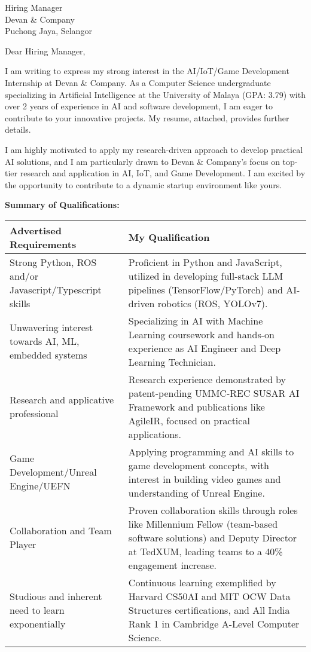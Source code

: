 \documentclass[10.5pt]{letter}
\date{\today}
\begin{document}
\begin{letter}{Hiring Manager\\Devan \& Company\\Puchong Jaya, Selangor}

\opening{Dear Hiring Manager,}

I am writing to express my strong interest in the AI/IoT/Game Development Internship at Devan \& Company. As a Computer Science undergraduate specializing in Artificial Intelligence at the University of Malaya (GPA: 3.79) with over 2 years of experience in AI and software development, I am eager to contribute to your innovative projects. My resume, attached, provides further details.

I am highly motivated to apply my research-driven approach to develop practical AI solutions, and I am particularly drawn to Devan \& Company's focus on top-tier research and application in AI, IoT, and Game Development.  I am excited by the opportunity to contribute to a dynamic startup environment like yours.

\vspace{0.3cm}
\textbf{Summary of Qualifications:}
\vspace{0.2cm}

\renewcommand{\arraystretch}{1.3}
\begin{tabularx}{\textwidth}{@{}p{}X@{}}
\textbf{Advertised Requirements} & \textbf{My Qualification} \\
\hline
Strong Python, ROS and/or Javascript/Typescript skills & Proficient in Python and JavaScript, utilized in developing full-stack LLM pipelines (TensorFlow/PyTorch) and AI-driven robotics (ROS, YOLOv7). \\
Unwavering interest towards AI, ML, embedded systems & Specializing in AI with Machine Learning coursework and hands-on experience as AI Engineer and Deep Learning Technician. \\
Research and applicative professional & Research experience demonstrated by patent-pending UMMC-REC SUSAR AI Framework and publications like AgileIR, focused on practical applications. \\
Game Development/Unreal Engine/UEFN &  Applying programming and AI skills to game development concepts, with interest in building video games and understanding of Unreal Engine.  \\
Collaboration and Team Player & Proven collaboration skills through roles like Millennium Fellow (team-based software solutions) and Deputy Director at TedXUM, leading teams to a 40\% engagement increase. \\
Studious and inherent need to learn exponentially &  Continuous learning exemplified by Harvard CS50AI and MIT OCW Data Structures certifications, and All India Rank 1 in Cambridge A-Level Computer Science. \\
\end{tabularx}


\end{letter}
\end{document}
